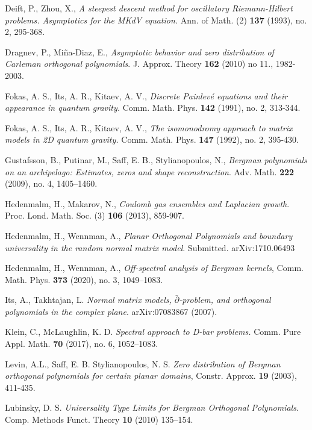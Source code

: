 \documentclass{amsart}
\theoremstyle{definition}
\theoremstyle{remark}
\numberwithin{equation}{subsection}
\begin{document}
\begin{thebibliography}{99}
 Deift, P., Zhou, X., 
\emph{A steepest descent method for oscillatory 
Riemann-Hilbert problems. Asymptotics for the MKdV equation.} 
Ann. of Math. (2) {\bf 137} 
(1993), no. 2, 295-368.

 Dragnev, P., Mi\~na-Diaz, E., \emph{Asymptotic
behavior and zero distribution of Carleman orthogonal polynomials}.
J. Approx. Theory \textbf{162} (2010) no 11., 1982-2003.

 Fokas, A. S., Its, A. R., Kitaev, A. V., 
\emph{Discrete Painlev{\'e} equations and their 
appearance in quantum gravity.} Comm. Math. Phys. {\bf 142} 
(1991), no. 2, 313-344.

 Fokas, A. S., Its, A. R., Kitaev, A. V., 
\emph{The isomonodromy approach to matrix 
models in 2D quantum gravity.} Comm. Math. Phys. {\bf 147} (1992), 
no. 2, 395-430.

 Gustafsson, B., Putinar, M., Saff, E. B., Stylianopoulos, N., 
\emph{Bergman polynomials on an archipelago: 
Estimates, zeros and shape reconstruction}. Adv. Math. \textbf{222} (2009), no. 4, 1405–1460.

Hedenmalm, H., Makarov, N., \emph{Coulomb gas ensembles 
and Laplacian growth}. Proc. Lond. Math. Soc. (3) {\bf 106} (2013), 859-907.

 Hedenmalm, H., Wennman, A., 
\emph{Planar Orthogonal Polynomials and boundary universality 
in the random normal matrix model}. Submitted. arXiv:1710.06493

 Hedenmalm, H., Wennman, A., 
\emph{Off-spectral analysis of Bergman kernels}, 
Comm. Math. Phys. \textbf{373} (2020), no. 3, 1049–1083.

 Its, A., Takhtajan, L. \emph{Normal matrix models, 
$\bar\partial$-problem, and orthogonal polynomials in the complex plane}. 
arXiv:07083867 (2007). 

 Klein, C., McLaughlin, K. D.
\emph{Spectral approach to D-bar problems.}
Comm. Pure Appl. Math. \textbf{70} (2017), no. 6, 1052–1083.

 Levin, A.L., Saff, E. B.  Stylianopoulos, N. S. 
\emph{Zero distribution of Bergman orthogonal polynomials 
for certain planar domains}, Constr. Approx. \textbf{19} (2003), 411-435.

 Lubinsky, D. S. 
\emph{Universality Type Limits for Bergman Orthogonal Polynomials.}
Comp. Methods Funct. Theory \textbf{10} (2010) 135–154.


\end{thebibliography}
\end{document}
